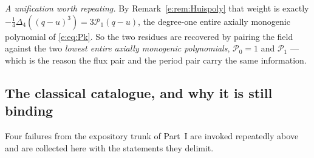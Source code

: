 \documentclass[11pt,a4paper]{article}
\numberwithin{equation}{section}
\theoremstyle{definition}
\theoremstyle{remark}
\theoremstyle{plain}
\newcommand{\lap}{\Delta_4}
\begin{document}
\emph{A unification worth repeating.} By Remark~\ref{e:rem:Huispoly} that
weight is exactly $-\tfrac14\lap((q-u)^3)=3\mathcal P_1(q-u)$, the
degree-one entire axially monogenic polynomial of \eqref{e:eq:Pk}. So the
two residues are recovered by pairing the field against the two
\emph{lowest entire axially monogenic polynomials}, $\mathcal P_0=1$ and
$\mathcal P_1$ --- which is the reason the flux pair and the period pair
carry the same information.

\subsection{The classical catalogue, and why it is still binding}
\label{f:ex:classical}

Four failures from the expository trunk of Part~I are invoked repeatedly
above and are collected here with the statements they delimit.
\end{document}
